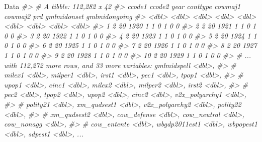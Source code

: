 \documentclass[
  11pt,
]{article}
\newenvironment{Shaded}{\begin{snugshade}}{\end{snugshade}}
\newcommand{\CommentTok}[1]{\textcolor[rgb]{0.56,0.35,0.01}{\textit{#1}}}
\newcommand{\NormalTok}[1]{#1}
\begin{document}
\begin{Shaded}
\begin{Highlighting}[]
\NormalTok{Data}
\CommentTok{\#\textgreater{} \# A tibble: 112,282 x 42}
\CommentTok{\#\textgreater{}    ccode1 ccode2  year conttype cowmaj1 cowmaj2   prd gmlmidonset gmlmidongoing}
\CommentTok{\#\textgreater{}     \textless{}dbl\textgreater{}  \textless{}dbl\textgreater{} \textless{}dbl\textgreater{}    \textless{}dbl\textgreater{}   \textless{}dbl\textgreater{}   \textless{}dbl\textgreater{} \textless{}dbl\textgreater{}       \textless{}dbl\textgreater{}         \textless{}dbl\textgreater{}}
\CommentTok{\#\textgreater{}  1      2     20  1920        1       1       0     1           0             0}
\CommentTok{\#\textgreater{}  2      2     20  1921        1       1       0     1           0             0}
\CommentTok{\#\textgreater{}  3      2     20  1922        1       1       0     1           0             0}
\CommentTok{\#\textgreater{}  4      2     20  1923        1       1       0     1           0             0}
\CommentTok{\#\textgreater{}  5      2     20  1924        1       1       0     1           0             0}
\CommentTok{\#\textgreater{}  6      2     20  1925        1       1       0     1           0             0}
\CommentTok{\#\textgreater{}  7      2     20  1926        1       1       0     1           0             0}
\CommentTok{\#\textgreater{}  8      2     20  1927        1       1       0     1           0             0}
\CommentTok{\#\textgreater{}  9      2     20  1928        1       1       0     1           0             0}
\CommentTok{\#\textgreater{} 10      2     20  1929        1       1       0     1           0             0}
\CommentTok{\#\textgreater{} \# ... with 112,272 more rows, and 33 more variables: gmlmidspell \textless{}dbl\textgreater{},}
\CommentTok{\#\textgreater{} \#   milex1 \textless{}dbl\textgreater{}, milper1 \textless{}dbl\textgreater{}, irst1 \textless{}dbl\textgreater{}, pec1 \textless{}dbl\textgreater{}, tpop1 \textless{}dbl\textgreater{},}
\CommentTok{\#\textgreater{} \#   upop1 \textless{}dbl\textgreater{}, cinc1 \textless{}dbl\textgreater{}, milex2 \textless{}dbl\textgreater{}, milper2 \textless{}dbl\textgreater{}, irst2 \textless{}dbl\textgreater{},}
\CommentTok{\#\textgreater{} \#   pec2 \textless{}dbl\textgreater{}, tpop2 \textless{}dbl\textgreater{}, upop2 \textless{}dbl\textgreater{}, cinc2 \textless{}dbl\textgreater{}, v2x\_polyarchy1 \textless{}dbl\textgreater{},}
\CommentTok{\#\textgreater{} \#   polity21 \textless{}dbl\textgreater{}, xm\_qudsest1 \textless{}dbl\textgreater{}, v2x\_polyarchy2 \textless{}dbl\textgreater{}, polity22 \textless{}dbl\textgreater{},}
\CommentTok{\#\textgreater{} \#   xm\_qudsest2 \textless{}dbl\textgreater{}, cow\_defense \textless{}dbl\textgreater{}, cow\_neutral \textless{}dbl\textgreater{}, cow\_nonagg \textless{}dbl\textgreater{},}
\CommentTok{\#\textgreater{} \#   cow\_entente \textless{}dbl\textgreater{}, wbgdp2011est1 \textless{}dbl\textgreater{}, wbpopest1 \textless{}dbl\textgreater{}, sdpest1 \textless{}dbl\textgreater{}, ...}
\end{Highlighting}
\end{Shaded}
\end{document}

